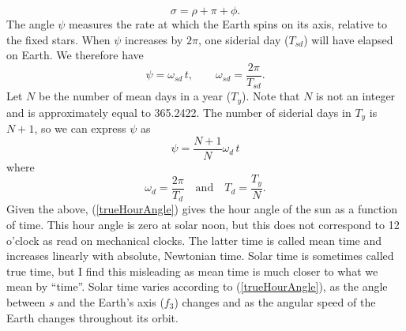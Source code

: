 \documentclass[12pt]{article}
\newcommand{\omd}{\omega_d}
\newcommand{\omsd}{\omega_{sd}}
\begin{document}
%
\begin{equation}
\sigma = \rho + \pi + \phi.
\end{equation}
%
The angle $\psi$ measures the rate at which the Earth spins on its axis, relative to the fixed stars. When $\psi$ increases by $2\pi$, one siderial day ($T_{sd}$) will have elapsed on Earth. We therefore have
%
\begin{equation} \label{psi1}
\psi = \omsd\, t, \qquad \omsd = \frac{2\pi}{T_{sd}}.
\end{equation}
%
Let $N$ be the number of mean days in a year ($T_y$). Note that $N$ is not an integer and is approximately equal to 365.2422. The number of siderial days in $T_y$ is $N+1$, so we can express $\psi$ as
%
\begin{equation}
\psi = \frac{N+1}{N}\omd\,t
\end{equation}
%
where
%
\begin{equation}
\omd = \frac{2\pi}{T_d} \quad \mathrm{and} \quad T_d = \frac{T_y}{N}.
\end{equation}
%
Given the above, (\ref{trueHourAngle}) gives the hour angle of the sun as a function of time. This hour angle is zero at solar noon, but this does not correspond to 12 o'clock as read on mechanical clocks. The latter time is called mean time and increases linearly with absolute, Newtonian time. Solar time is sometimes called true time, but I find this misleading as mean time is much closer to what we mean by ``time''. Solar time varies according to (\ref{trueHourAngle}), as the angle between $s$ and the Earth's axis ($f_3$) changes and as the angular speed of the Earth changes throughout its orbit.
\end{document}
